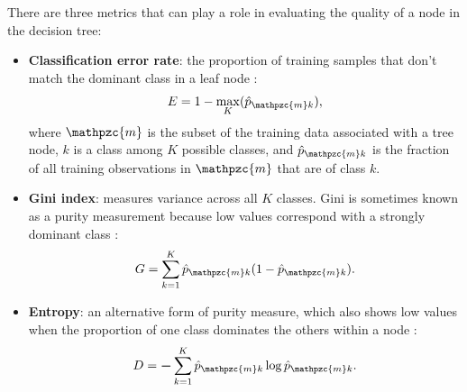 There are three metrics that can play a role in evaluating the quality of a node in the decision tree:
\begin{itemize}[itemsep=2pt]\label{ch3:impurity}
    \item \textbf{Classification error rate}: the proportion of training samples that don't match the dominant class in a leaf node \citep[p.\ 312]{james_introduction_2013}:
    \begin{equation}
    \label{eq:error_rate}
        E = 1 - \max_K(\hat{p}_{\mathpzc{m}k}),
    \end{equation}
    where $\mathpzc{m}$ is the subset of the training data associated with a tree node, $k$ is a class among $K$ possible classes, and $\hat{p}_{\mathpzc{m}k}$ is the fraction of all training observations in $\mathpzc{m}$ that are of class $k$.
    
    \item \textbf{Gini index}: measures variance across all $K$ classes. Gini is sometimes known as a purity measurement because low values correspond with a strongly dominant class \citep[p.\ 312]{james_introduction_2013}:
    \begin{equation}
    \label{eq:gini}
        G = \sum_{k=1}^{K}{\hat{p}_{\mathpzc{m}k}(1-\hat{p}_{\mathpzc{m}k})}.
    \end{equation}
    
    \item \textbf{Entropy}: an alternative form of purity measure, which also shows low values when the proportion of one class dominates the others within a node \citep[p.\ 312]{james_introduction_2013}:
    \begin{equation}
    \label{eq:entropy}
        D = \boldsymbol{-}\sum_{k=1}^{K}\hat{p}_{\mathpzc{m}k} \log\hat{p}_{\mathpzc{m}k}.
    \end{equation}
\end{itemize}

